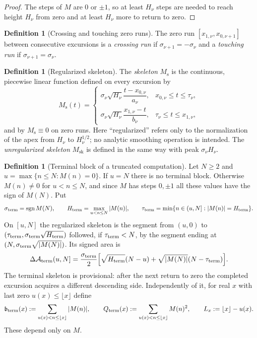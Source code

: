 \documentclass[11pt,reqno]{amsart}
\numberwithin{equation}{section}
\theoremstyle{plain}
\theoremstyle{definition}
\newtheorem{definition}[theorem]{Definition}
\theoremstyle{remark}
\DeclareMathOperator{\sgn}{sgn}
\newcommand{\Ms}{M_{\mathrm{s}}}
\newcommand{\Msk}{M_{\mathrm{sk}}}
\newcommand{\Anet}{\mathcal{A}}
\begin{document}
\begin{proof}
The steps of $M$ are $0$ or $\pm1$, so at least $H_\nu$ steps are needed to
reach height $H_\nu$ from zero and at least $H_\nu$ more to return to zero.
\end{proof}

\begin{definition}[Crossing and touching zero runs]
\label{def:crossing_touching}
The zero run $[x_{1,\nu},x_{0,\nu+1}]$ between consecutive excursions is a
\emph{crossing run} if $\sigma_{\nu+1}=-\sigma_\nu$ and a \emph{touching run}
if $\sigma_{\nu+1}=\sigma_\nu$.
\end{definition}

\begin{definition}[Regularized skeleton]
\label{def:Ms}
The \emph{skeleton} $\Ms$ is the continuous, piecewise linear function
defined on every excursion by
\begin{equation}
\label{eq:Ms_def}
\Ms(t)=
\begin{cases}
\sigma_\nu\sqrt{H_\nu}\dfrac{t-x_{0,\nu}}{a_\nu},
 &x_{0,\nu}\le t\le\tau_\nu,\\[2ex]
\sigma_\nu\sqrt{H_\nu}\dfrac{x_{1,\nu}-t}{b_\nu},
 &\tau_\nu\le t\le x_{1,\nu},
\end{cases}
\end{equation}
and by $\Ms\equiv0$ on zero runs.  Here ``regularized'' refers only to
the normalization of the apex from $H_\nu$ to $H_\nu^{1/2}$; no analytic
smoothing operation is intended.  The \emph{unregularized skeleton} $\Msk$
is defined in the same way with peak $\sigma_\nu H_\nu$.
\end{definition}

\begin{definition}[Terminal block of a truncated computation]
\label{def:Ms-terminal}
Let $N\ge2$ and $u=\max\{n\le N:M(n)=0\}$. If $u=N$ there is no terminal
block. Otherwise $M(n)\ne0$ for $u<n\le N$, and since $M$ has steps
$0,\pm1$ all these values have the sign of $M(N)$. Put
\begin{equation}
\sigma_{\rm term}=\sgn M(N),\qquad
H_{\rm term}=\max_{u<n\le N}|M(n)|,\qquad
\tau_{\rm term}=\min\{n\in(u,N]:|M(n)|=H_{\rm term}\}.
\end{equation}
On $[u,N]$ the regularized skeleton is the segment from $(u,0)$ to
$(\tau_{\rm term},\sigma_{\rm term}\sqrt{H_{\rm term}})$ followed, if
$\tau_{\rm term}<N$, by the segment ending at
$(N,\sigma_{\rm term}\sqrt{|M(N)|})$. Its signed area is
\begin{equation}
\Delta\Anet_{\rm term}(u,N]=\frac{\sigma_{\rm term}}2
\Bigl[\sqrt{H_{\rm term}}(N-u)+
\sqrt{|M(N)|}(N-\tau_{\rm term})\Bigr].
\end{equation}
The terminal skeleton is provisional: after the next return to zero the
completed excursion acquires a different descending side. Independently of
it, for real $x$ with last zero $u(x)\le\lfloor x\rfloor$ define
\begin{equation}
\mathfrak b_{\rm term}(x):=\sum_{u(x)<n\le\lfloor x\rfloor}|M(n)|,\qquad
Q_{\rm term}(x):=\sum_{u(x)<n\le\lfloor x\rfloor}M(n)^2,\qquad
L_x:=\lfloor x\rfloor-u(x).
\end{equation}
These depend only on $M$.
\end{definition}
\end{document}
